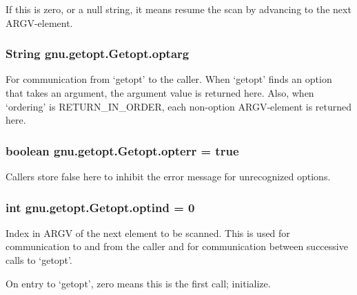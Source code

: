 If this is zero, or a null string, it means resume the scan by advancing to the next ARGV-\/element. \hypertarget{classgnu_1_1getopt_1_1_getopt_a1b9f80db609f412ec4650ca9a8280882}{
\subsubsection[{optarg}]{\setlength{\rightskip}{0pt plus 5cm}String {\bf gnu.getopt.Getopt.optarg}}}
\label{classgnu_1_1getopt_1_1_getopt_a1b9f80db609f412ec4650ca9a8280882}
For communication from `getopt' to the caller. When `getopt' finds an option that takes an argument, the argument value is returned here. Also, when `ordering' is RETURN\_\-IN\_\-ORDER, each non-\/option ARGV-\/element is returned here. \hypertarget{classgnu_1_1getopt_1_1_getopt_a8712d370a08f90b7b49b0261a2df8581}{
\subsubsection[{opterr}]{\setlength{\rightskip}{0pt plus 5cm}boolean {\bf gnu.getopt.Getopt.opterr} = true}}
\label{classgnu_1_1getopt_1_1_getopt_a8712d370a08f90b7b49b0261a2df8581}
Callers store false here to inhibit the error message for unrecognized options. \hypertarget{classgnu_1_1getopt_1_1_getopt_ae80c10d8bfc957fd93bec2f3619cbf18}{
\subsubsection[{optind}]{\setlength{\rightskip}{0pt plus 5cm}int {\bf gnu.getopt.Getopt.optind} = 0}}
\label{classgnu_1_1getopt_1_1_getopt_ae80c10d8bfc957fd93bec2f3619cbf18}
Index in ARGV of the next element to be scanned. This is used for communication to and from the caller and for communication between successive calls to `getopt'.

On entry to `getopt', zero means this is the first call; initialize.

